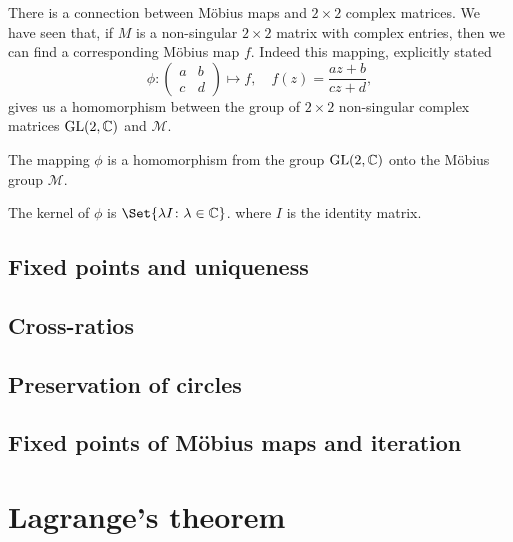 \documentclass[main.tex]{subfiles}
\begin{document}
		There is a connection between M\"obius maps and $2 \times 2$ complex matrices. We have seen that, if $M$ is a non-singular $2 \times 2$ matrix with complex entries, then we can find a corresponding M\"obius map $f$. Indeed this mapping, explicitly stated
		\begin{equation*}
			\phi\colon 
			\begin{pmatrix}
			a	&	b 	\\
			c	&	d	
			\end{pmatrix}
			\mapsto f, \quad f(z) = \frac{az + b}{cz + d},
		\end{equation*}
		gives us a homomorphism between the group of $2 \times 2$ non-singular complex matrices $\mathrm{GL}(2, \mathbb C)$ and $\mathcal{M}$.
		\begin{theorem}
			The mapping $\phi$ is a homomorphism from the group $\mathrm{GL}(2, \mathbb C)$ onto the M\"obius group $\mathcal{M}$.
		\end{theorem}
		\begin{lemma}
			The kernel of $\phi$ is $\Set{\lambda I \colon \lambda \in \CC}$. where $I$ is the identity matrix.
		\end{lemma}
		
		\subsection{Fixed points and uniqueness}
			
		\subsection{Cross-ratios}
		
		\subsection{Preservation of circles}
		
		\subsection{Fixed points of M\"obius maps and iteration}
		
		
		\section{Lagrange's theorem}
\end{document}
